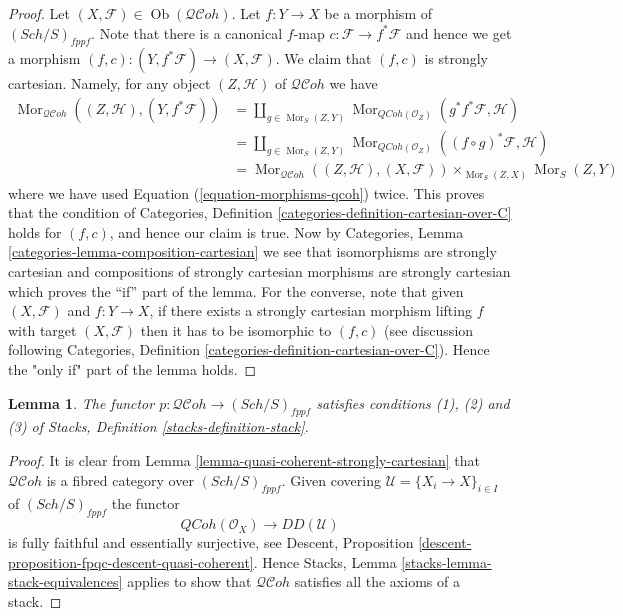 \documentclass{stacks-project}
\theoremstyle{plain}
\newtheorem{lemma}[subsection]{Lemma}
\theoremstyle{definition}
\theoremstyle{remark}
\numberwithin{equation}{subsection}
\def\Sch{\mathit{Sch}}
\def\Mor{\mathop{\mathrm{Mor}}\nolimits}
\def\Ob{\mathop{\mathrm{Ob}}\nolimits}
\def\QCoh{\mathit{QCoh}}
\def\QCohstack{\mathcal{QC}\!\mathit{oh}}
\begin{document}
\begin{proof}
Let $(X, \mathcal{F}) \in \Ob(\QCohstack)$.
Let $f : Y \to X$ be a morphism of $(\Sch/S)_{fppf}$.
Note that there is a canonical $f$-map $c : \mathcal{F} \to f^*\mathcal{F}$
and hence we get a morphism
$(f, c) : (Y, f^*\mathcal{F}) \to (X, \mathcal{F})$.
We claim that $(f, c)$ is strongly cartesian.
Namely, for any object $(Z, \mathcal{H})$ of $\QCohstack$ we have
\begin{align*}
\Mor_{\QCohstack}((Z, \mathcal{H}), (Y, f^*\mathcal{F}))
& =
\coprod\nolimits_{g \in \Mor_S(Z, Y)}
\Mor_{\QCoh(\mathcal{O}_Z)}(g^*f^*\mathcal{F}, \mathcal{H}) \\
& =
\coprod\nolimits_{g \in \Mor_S(Z, Y)}
\Mor_{\QCoh(\mathcal{O}_Z)}((f \circ g)^*\mathcal{F}, \mathcal{H}) \\
& =
\Mor_{\QCohstack}((Z, \mathcal{H}), (X, \mathcal{F}))
\times_{\Mor_S(Z, X)} \Mor_S(Z, Y)
\end{align*}
where we have used Equation (\ref{equation-morphisms-qcoh}) twice.
This proves that the condition of
Categories, Definition \ref{categories-definition-cartesian-over-C}
holds for $(f, c)$, and hence our claim is true. Now by
Categories, Lemma \ref{categories-lemma-composition-cartesian}
we see that isomorphisms are strongly cartesian and
compositions of strongly cartesian morphisms are strongly cartesian
which proves the ``if'' part of the lemma. For the converse, note
that given $(X, \mathcal{F})$ and $f : Y \to X$, if there exists a
strongly cartesian morphism lifting $f$ with target $(X, \mathcal{F})$
then it has to be isomorphic to $(f, c)$ (see discussion following
Categories, Definition \ref{categories-definition-cartesian-over-C}).
Hence the "only if" part of the lemma holds.
\end{proof}

\begin{lemma}
\label{lemma-stack-of-quasi-coherent-sheaves}
The functor $p : \QCohstack \to (\Sch/S)_{fppf}$
satisfies conditions (1), (2) and (3) of
Stacks, Definition \ref{stacks-definition-stack}.
\end{lemma}

\begin{proof}
It is clear from
Lemma \ref{lemma-quasi-coherent-strongly-cartesian}
that $\QCohstack$ is a fibred category over $(\Sch/S)_{fppf}$.
Given covering $\mathcal{U} = \{X_i \to X\}_{i \in I}$ of
$(\Sch/S)_{fppf}$ the functor
$$
\QCoh(\mathcal{O}_X) \longrightarrow DD(\mathcal{U})
$$
is fully faithful and essentially surjective, see
Descent, Proposition \ref{descent-proposition-fpqc-descent-quasi-coherent}.
Hence
Stacks, Lemma \ref{stacks-lemma-stack-equivalences}
applies to show that $\QCohstack$ satisfies all the
axioms of a stack.
\end{proof}
\end{document}

